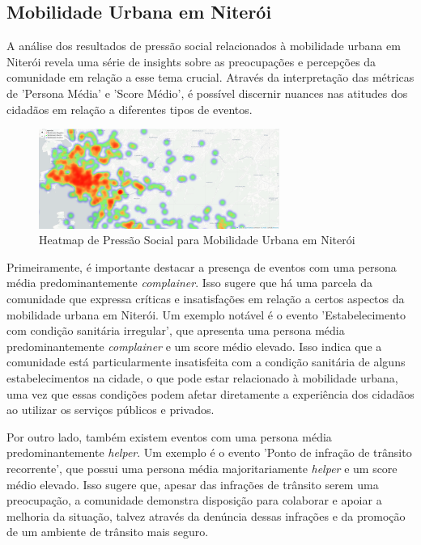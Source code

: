 \subsection{Mobilidade Urbana em Niterói}

A análise dos resultados de pressão social relacionados à mobilidade urbana em Niterói revela uma série de insights sobre as preocupações e percepções da comunidade em relação a esse tema crucial. Através da interpretação das métricas de 'Persona Média' e 'Score Médio', é possível discernir nuances nas atitudes dos cidadãos em relação a diferentes tipos de eventos.

\begin{figure}[htb]
	\centering
	\includegraphics[width=0.7\textwidth]{images/heatmap_niteroi.PNG}
	\caption{Heatmap de Pressão Social para Mobilidade Urbana em Niterói}
	\label{fig:heatmap_niteroi}
\end{figure}

Primeiramente, é importante destacar a presença de eventos com uma persona média predominantemente \textit{complainer}. Isso sugere que há uma parcela da comunidade que expressa críticas e insatisfações em relação a certos aspectos da mobilidade urbana em Niterói. Um exemplo notável é o evento 'Estabelecimento com condição sanitária irregular', que apresenta uma persona média predominantemente \textit{complainer} e um score médio elevado. Isso indica que a comunidade está particularmente insatisfeita com a condição sanitária de alguns estabelecimentos na cidade, o que pode estar relacionado à mobilidade urbana, uma vez que essas condições podem afetar diretamente a experiência dos cidadãos ao utilizar os serviços públicos e privados.

Por outro lado, também existem eventos com uma persona média predominantemente \textit{helper}. Um exemplo é o evento 'Ponto de infração de trânsito recorrente', que possui uma persona média majoritariamente \textit{helper} e um score médio elevado. Isso sugere que, apesar das infrações de trânsito serem uma preocupação, a comunidade demonstra disposição para colaborar e apoiar a melhoria da situação, talvez através da denúncia dessas infrações e da promoção de um ambiente de trânsito mais seguro.

